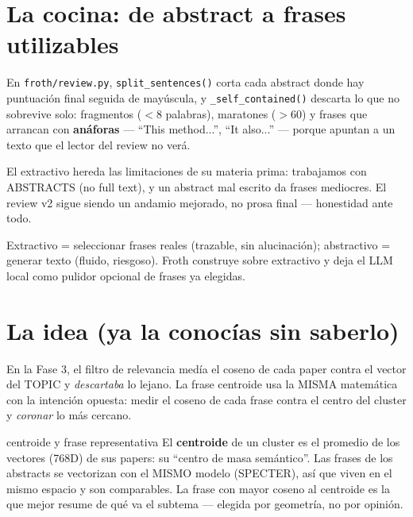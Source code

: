 \documentclass[11pt,a4paper]{article}
\begin{document}
\section{La cocina: de abstract a frases utilizables}

En \texttt{froth/review.py}, \texttt{split\_sentences()} corta cada abstract donde hay
puntuación final seguida de mayúscula, y \texttt{\_self\_contained()} descarta lo que no
sobrevive solo: fragmentos ($<$8 palabras), maratones ($>$60) y frases que arrancan con
\textbf{anáforas} --- ``This method...'', ``It also...'' --- porque apuntan a un texto que
el lector del review no verá.

\begin{ojo}
El extractivo hereda las limitaciones de su materia prima: trabajamos con ABSTRACTS
(no full text), y un abstract mal escrito da frases mediocres. El review v2 sigue siendo
un andamio mejorado, no prosa final --- honestidad ante todo.
\end{ojo}

\begin{resumen}
Extractivo = seleccionar frases reales (trazable, sin alucinación); abstractivo = generar
texto (fluido, riesgoso). Froth construye sobre extractivo y deja el LLM local como
pulidor opcional de frases ya elegidas.
\end{resumen}
\clearpage
{}
{}

\section{La idea (ya la conocías sin saberlo)}

En la Fase 3, el filtro de relevancia medía el coseno de cada paper contra el vector del
TOPIC y \emph{descartaba} lo lejano. La frase centroide usa la MISMA matemática con la
intención opuesta: medir el coseno de cada frase contra el centro del cluster y
\emph{coronar} lo más cercano.

\begin{concepto}{centroide y frase representativa}
El \textbf{centroide} de un cluster es el promedio de los vectores (768D) de sus papers:
su ``centro de masa semántico''. Las frases de los abstracts se vectorizan con el MISMO
modelo (SPECTER), así que viven en el mismo espacio y son comparables. La frase con mayor
coseno al centroide es la que mejor resume de qué va el subtema --- elegida por geometría,
no por opinión.
\end{concepto}
\end{document}
